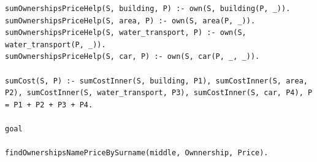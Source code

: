 \documentclass[12pt]{report}
\begin{document}
\begin{lstlisting}
sumOwnershipsPriceHelp(S, building, P) :- own(S, building(P, _)).
sumOwnershipsPriceHelp(S, area, P) :- own(S, area(P, _)).
sumOwnershipsPriceHelp(S, water_transport, P) :- own(S, water_transport(P, _)).
sumOwnershipsPriceHelp(S, car, P) :- own(S, car(P, _, _)).

sumCost(S, P) :- sumCostInner(S, building, P1), sumCostInner(S, area, P2), sumCostInner(S, water_transport, P3), sumCostInner(S, car, P4), P = P1 + P2 + P3 + P4.

goal

findOwnershipsNamePriceBySurname(middle, Ownnership, Price).


	\end{lstlisting}

	

	
\end{document}
